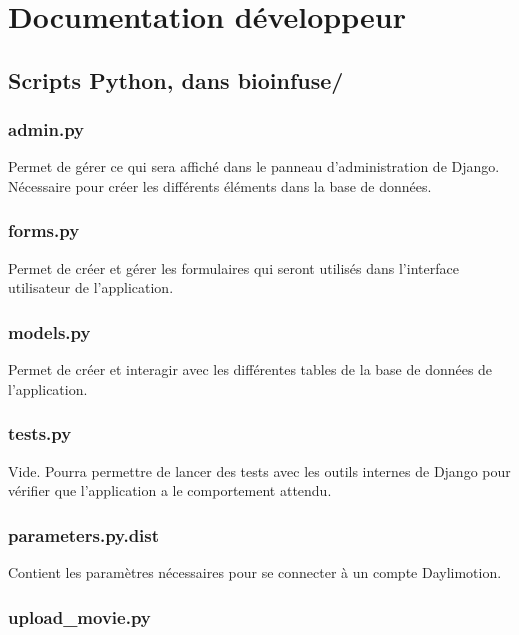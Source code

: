 \chapter{Documentation développeur}

\section{Scripts Python, dans bioinfuse/}

\subsection{admin.py}

Permet de gérer ce qui sera affiché dans le panneau d'administration de Django. Nécessaire pour créer les différents éléments dans la base de données.

\subsection{forms.py}

Permet de créer et gérer les formulaires qui seront utilisés dans l'interface utilisateur de l'application.

\subsection{models.py}

Permet de créer et interagir avec les différentes tables de la base de données de l'application.

\subsection{tests.py}

Vide. Pourra permettre de lancer des tests avec les outils internes de Django pour vérifier que l'application a le comportement attendu.

\subsection{parameters.py.dist}

Contient les paramètres nécessaires pour se connecter à un compte Daylimotion.

\subsection{upload\_movie.py}

